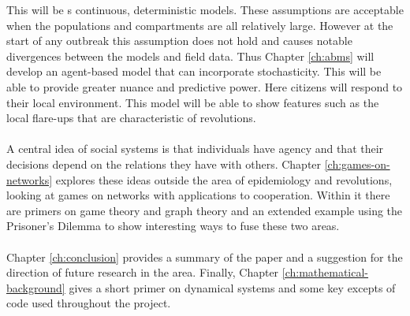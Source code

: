 This will be s continuous, deterministic models. These assumptions are acceptable when the populations and compartments are all relatively large. However at the start of any outbreak this assumption does not hold and causes notable divergences between the models and field data. Thus Chapter \ref{ch:abms} will develop an agent-based model that can incorporate stochasticity. This will be able to provide greater nuance and predictive power. Here citizens will respond to their local environment. This model will be able to show features such as the local flare-ups that are characteristic of revolutions.\\
\\
A central idea of social systems is that individuals have agency and that their decisions depend on the relations they have with others. Chapter \ref{ch:games-on-networks} explores these ideas outside the area of epidemiology and revolutions, looking at games on networks with applications to cooperation. Within it there are primers on game theory and graph theory and an extended example using the Prisoner's Dilemma to show interesting ways to fuse these two areas.\\
\\
Chapter \ref{ch:conclusion} provides a summary of the paper and a suggestion for the direction of future research in the area. Finally, Chapter \ref{ch:mathematical-background} gives a short primer on dynamical systems and some key excepts of code used throughout the project.


